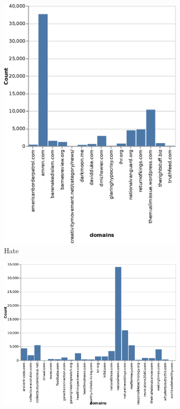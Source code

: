 \begin{figure}[!ht]
\begin{subfigure}[b]{0.3\textwidth}
         \includegraphics[width=\textwidth,height=0.3\textheight]{images/data_exploration/hate.eps}
         \caption{Hate}
     \end{subfigure}
     \hfill
     \begin{subfigure}[b]{0.3\textwidth}
         \centering
         \includegraphics[width=\textwidth,height=0.3\textheight]{images/data_exploration/junksci.eps}

\end{subfigure}
\end{figure}
